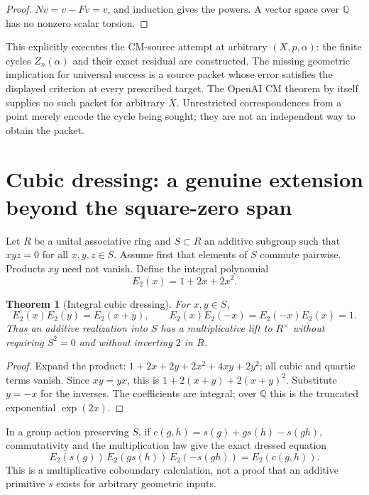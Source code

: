 \documentclass[11pt]{article}
\newtheorem{theorem}{Theorem}
\newcommand{\Q}{\mathbb Q}
\begin{document}
\begin{proof}
$Nv=v-Fv=v$, and induction gives the powers. A vector space over $\Q$
has no nonzero scalar torsion.
\end{proof}
This explicitly executes the CM-source attempt at arbitrary $(X,p,\alpha)$:
the finite cycles $Z_n(\alpha)$ and their exact residual are constructed.
The missing geometric implication for universal success is a source packet
whose error satisfies the displayed criterion at every prescribed target.
The OpenAI CM theorem by itself supplies no such packet for arbitrary $X$.
Unrestricted correspondences from a point merely encode the cycle being
sought; they are not an independent way to obtain the packet.

\section{Cubic dressing: a genuine extension beyond the square-zero span}
Let $R$ be a unital associative ring and $S\subset R$ an additive subgroup
such that $xyz=0$ for all $x,y,z\in S$. Assume first that elements of $S$
commute pairwise. Products $xy$ need not vanish. Define the integral
polynomial
\[
 E_2(x)=1+2x+2x^2.
\]
\begin{theorem}[Integral cubic dressing]
For $x,y\in S$,
\[
 E_2(x)E_2(y)=E_2(x+y),\qquad
 E_2(x)E_2(-x)=E_2(-x)E_2(x)=1.
\]
Thus an additive realization into $S$ has a multiplicative lift to
$R^\times$ without requiring $S^2=0$ and without inverting $2$ in $R$.
\end{theorem}
\begin{proof}
Expand the product:
$1+2x+2y+2x^2+4xy+2y^2$; all cubic and quartic terms vanish.
Since $xy=yx$, this is $1+2(x+y)+2(x+y)^2$.
Substitute $y=-x$ for the inverses. The coefficients are integral;
over $\Q$ this is the truncated exponential $\exp(2x)$.
\end{proof}
In a group action preserving $S$, if $c(g,h)=s(g)+g s(h)-s(gh)$,
commutativity and the multiplication law give the exact dressed equation
\[
 E_2(s(g))\,E_2(g s(h))\,E_2(-s(gh))=E_2(c(g,h)).
\]
This is a multiplicative coboundary calculation, not a proof that an
additive primitive $s$ exists for arbitrary geometric inputs.
\end{document}
